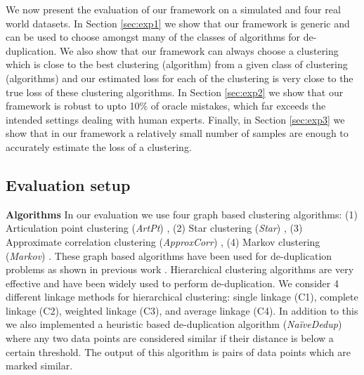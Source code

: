 \documentclass[12pt]{article}
\begin{document}
We now present the evaluation of our framework on a simulated and four real world datasets.
In Section \ref{sec:exp1} we show that our framework is generic and can be used to choose amongst many of the classes of algorithms for de-duplication. We also show that our framework can always choose a clustering which is close to the best clustering (algorithm) from a given class of clustering (algorithms) and our estimated loss for each of the clustering is very close to the true loss of these clustering algorithms.
In Section \ref{sec:exp2} we show that our framework is robust to upto 10\% of oracle mistakes, which far exceeds the intended settings dealing with human experts.
Finally, in Section \ref{sec:exp3} we show that in our framework a relatively small number of samples are enough to accurately estimate the loss of a clustering.

\subsection{Evaluation setup}
\label{sec:setup}
\textbf{Algorithms} In our evaluation we use four graph based clustering algorithms: (1) Articulation point clustering (\textit{ArtPt}) \cite{cormen2009introduction}, (2) Star clustering (\textit{Star}) \cite{aslam2006star}, (3) Approximate correlation clustering (\textit{ApproxCorr}) \cite{bansal2004correlation}, (4) Markov clustering (\textit{Markov}) \cite{van2000graph}. These graph based algorithms have been used for de-duplication problems as shown in previous work \cite{hassanzadeh2009framework}.
Hierarchical clustering algorithms are very effective and have been widely used to perform de-duplication. We consider 4 different linkage methods for hierarchical clustering: single linkage (C1), complete linkage (C2), weighted linkage (C3), and average linkage (C4). 
In addition to this we also implemented a heuristic based de-duplication algorithm (\textit{Na\"iveDedup}) where any two data points are considered similar if their distance is below a certain threshold. The output of this algorithm is pairs of data points which are marked similar.
\end{document}
